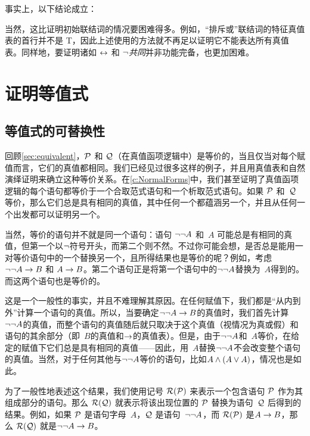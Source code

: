 事实上，以下结论成立：


当然，这比证明初始联结词的情况要困难得多。例如，“排斥或”联结词的特征真值表的首行并不是 T，因此上述使用的方法就不再足以证明它不能表达所有真值表。同样地，要证明诸如 $\leftrightarrow$ 和 $\neg$\emph{共同}并非功能完备，也更加困难。

\chapter{证明等值式}\label{ch:equivalences}

\section{等值式的可替换性}

回顾\cref{sec:equivalent}，$\mathcal{P}$ 和 $\mathcal{Q}$（在真值函项逻辑中）是等价的，当且仅当对每个赋值而言，它们的真值都相同。我们已经见过很多这样的例子，并且用真值表和自然演绎证明来确立这种等价关系。在\cref{c:NormalForms}中，我们甚至证明了真值函项逻辑的每个语句都等价于一个合取范式语句和一个析取范式语句。如果 $\mathcal{P}$ 和~$\mathcal{Q}$ 等价，那么它们总是具有相同的真值，其中任何一个都蕴涵另一个，并且从任何一个出发都可以证明另一个。

当然，等价的语句并不就是同一个语句：语句 $\neg\neg A$ 和~$A$ 可能总是有相同的真值，但第一个以$\neg$符号开头，而第二个则不然。不过你可能会想，是否总是能用一对等价语句中的一个替换另一个，且所得结果也是等价的呢？例如，考虑 $\neg\neg A \rightarrow B$ 和 $A \rightarrow B$。第二个语句正是将第一个语句中的$\neg\neg A$替换为~$A$得到的。而这两个语句也是等价的。

这是一个一般性的事实，并且不难理解其原因。在任何赋值下，我们都是“从内到外”计算一个语句的真值。所以，当要确定$\neg\neg A \rightarrow B$的真值时，我们首先计算$\neg\neg A$的真值，而整个语句的真值随后就只取决于这个真值（视情况为真或假）和语句的其余部分（即~$B$的真值和$\rightarrow$的真值表）。但是，由于$\neg\neg A$和~$A$等价，在给定的赋值下它们总是具有相同的真值——因此，用~$A$替换$\neg\neg A$不会改变整个语句的真值。当然，对于任何其他与$\neg\neg A$等价的语句，比如$A \wedge (A \vee A)$，情况也是如此。

为了一般性地表述这个结果，我们使用记号 $\mathcal{R}(\mathcal{P})$ 来表示一个包含语句 $\mathcal{P}$ 作为其组成部分的语句。那么 $\mathcal{R}(\mathcal{Q})$ 就表示将该出现位置的 $\mathcal{P}$ 替换为语句~$\mathcal{Q}$ 后得到的结果。例如，如果 $\mathcal{P}$ 是语句字母~$A$，$\mathcal{Q}$ 是语句~$\neg\neg A$，而 $\mathcal{R}(\mathcal{P})$ 是$A \rightarrow B$，那么 $\mathcal{R}(\mathcal{Q})$ 就是$\neg\neg A \rightarrow B$。

